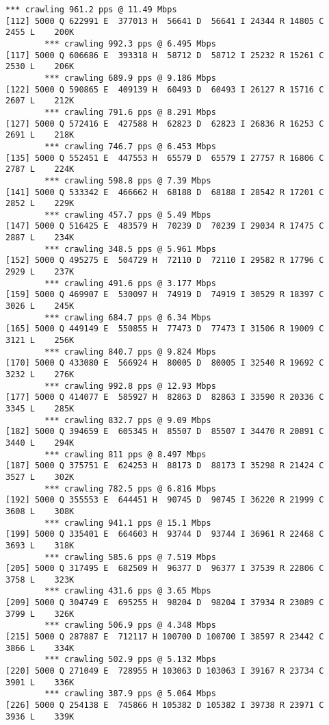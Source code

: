 \documentclass[11pt]{article}
\begin{document}
\begin{lstlisting}[label=app-trace,caption=Output of Homework 1]
        *** crawling 961.2 pps @ 11.49 Mbps
[112] 5000 Q 622991 E  377013 H  56641 D  56641 I 24344 R 14805 C  2455 L    200K
        *** crawling 992.3 pps @ 6.495 Mbps
[117] 5000 Q 606686 E  393318 H  58712 D  58712 I 25232 R 15261 C  2530 L    206K
        *** crawling 689.9 pps @ 9.186 Mbps
[122] 5000 Q 590865 E  409139 H  60493 D  60493 I 26127 R 15716 C  2607 L    212K
        *** crawling 791.6 pps @ 8.291 Mbps
[127] 5000 Q 572416 E  427588 H  62823 D  62823 I 26836 R 16253 C  2691 L    218K
        *** crawling 746.7 pps @ 6.453 Mbps
[135] 5000 Q 552451 E  447553 H  65579 D  65579 I 27757 R 16806 C  2787 L    224K
        *** crawling 598.8 pps @ 7.39 Mbps
[141] 5000 Q 533342 E  466662 H  68188 D  68188 I 28542 R 17201 C  2852 L    229K
        *** crawling 457.7 pps @ 5.49 Mbps
[147] 5000 Q 516425 E  483579 H  70239 D  70239 I 29034 R 17475 C  2887 L    234K
        *** crawling 348.5 pps @ 5.961 Mbps
[152] 5000 Q 495275 E  504729 H  72110 D  72110 I 29582 R 17796 C  2929 L    237K
        *** crawling 491.6 pps @ 3.177 Mbps
[159] 5000 Q 469907 E  530097 H  74919 D  74919 I 30529 R 18397 C  3026 L    245K
        *** crawling 684.7 pps @ 6.34 Mbps
[165] 5000 Q 449149 E  550855 H  77473 D  77473 I 31506 R 19009 C  3121 L    256K
        *** crawling 840.7 pps @ 9.824 Mbps
[170] 5000 Q 433080 E  566924 H  80005 D  80005 I 32540 R 19692 C  3232 L    276K
        *** crawling 992.8 pps @ 12.93 Mbps
[177] 5000 Q 414077 E  585927 H  82863 D  82863 I 33590 R 20336 C  3345 L    285K
        *** crawling 832.7 pps @ 9.09 Mbps
[182] 5000 Q 394659 E  605345 H  85507 D  85507 I 34470 R 20891 C  3440 L    294K
        *** crawling 811 pps @ 8.497 Mbps
[187] 5000 Q 375751 E  624253 H  88173 D  88173 I 35298 R 21424 C  3527 L    302K
        *** crawling 782.5 pps @ 6.816 Mbps
[192] 5000 Q 355553 E  644451 H  90745 D  90745 I 36220 R 21999 C  3608 L    308K
        *** crawling 941.1 pps @ 15.1 Mbps
[199] 5000 Q 335401 E  664603 H  93744 D  93744 I 36961 R 22468 C  3693 L    318K
        *** crawling 585.6 pps @ 7.519 Mbps
[205] 5000 Q 317495 E  682509 H  96377 D  96377 I 37539 R 22806 C  3758 L    323K
        *** crawling 431.6 pps @ 3.65 Mbps
[209] 5000 Q 304749 E  695255 H  98204 D  98204 I 37934 R 23089 C  3799 L    326K
        *** crawling 506.9 pps @ 4.348 Mbps
[215] 5000 Q 287887 E  712117 H 100700 D 100700 I 38597 R 23442 C  3866 L    334K
        *** crawling 502.9 pps @ 5.132 Mbps
[220] 5000 Q 271049 E  728955 H 103063 D 103063 I 39167 R 23734 C  3901 L    336K
        *** crawling 387.9 pps @ 5.064 Mbps
[226] 5000 Q 254138 E  745866 H 105382 D 105382 I 39738 R 23971 C  3936 L    339K

\end{lstlisting}
\end{document}
